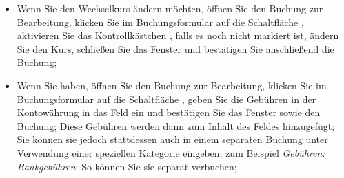 \begin{itemize}
	\Note{}: Sie können die Umrechnungsrichtung umkehren (ein Euro entspricht X Einheiten der Währung oder eine Einheit der Währung entspricht Y Euro), indem Sie die Namen der Währungen in den beiden Dropdown-Listen vertauschen; so können Sie den Wechselkurs genau so eingeben, wie er Ihnen mitgeteilt wurde; dieser Kurs kann jederzeit nach der Erstellung der Buchung angepasst werden.
	\item Wenn Sie den Wechselkurs ändern möchten, öffnen Sie den Buchung zur Bearbeitung, klicken Sie im Buchungsformular auf die Schaltfläche , aktivieren Sie das Kontrollkästchen , falls es noch nicht markiert ist, ändern Sie den Kurs, schließen Sie das Fenster und bestätigen Sie anschließend die Buchung;
	\item Wenn Sie  haben, öffnen Sie den Buchung zur Bearbeitung, klicken Sie im Buchungsformular auf die Schaltfläche , geben Sie die Gebühren in der Kontowährung in das Feld  ein und bestätigen Sie das Fenster sowie den Buchung; Diese Gebühren werden dann zum Inhalt des Feldes  hinzugefügt; Sie können sie jedoch stattdessen auch in einem separaten Buchung unter Verwendung einer speziellen Kategorie eingeben, zum Beispiel \emph{Gebühren: Bankgebühren}: So können Sie sie separat verbuchen;

\end{itemize}
